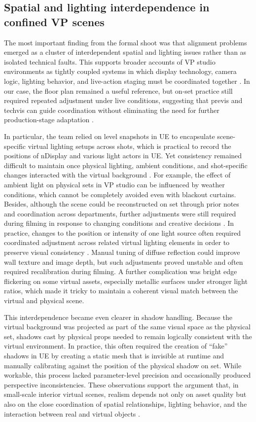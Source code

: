 \documentclass[conference]{IEEEtran}
\begin{document}
\subsection{Spatial and lighting interdependence in confined VP scenes}
The most important finding from the formal shoot was that alignment problems emerged as a cluster of interdependent spatial and lighting issues rather than as isolated technical faults. This supports broader accounts of VP studio environments as tightly coupled systems in which display technology, camera logic, lighting behavior, and live-action staging must be coordinated together \cite{Kavakli2022studio}. In our case, the floor plan remained a useful reference, but on-set practice still required repeated adjustment under live conditions, suggesting that previs and techvis can guide coordination without eliminating the need for further production-stage adaptation \cite{Kadner2019,Dean2026workflow}.

In particular, the team relied on level snapshots in UE to encapsulate scene-specific virtual lighting setups across shots, which is practical to record the positions of nDisplay and various light actors in UE. Yet consistency remained difficult to maintain once physical lighting, ambient conditions, and shot-specific changes interacted with the virtual background \cite{Kavakli2022studio}. For example, the effect of ambient light on physical sets in VP studio can be influenced by weather conditions, which cannot be completely avoided even with blackout curtains. Besides, although the scene could be reconstructed on set through prior notes and coordination across departments, further adjustments were still required during filming in response to changing conditions and creative decisions \cite{Dean2026workflow}. In practice, changes to the position or intensity of one light source often required coordinated adjustment across related virtual lighting elements in order to preserve visual consistency \cite{Kavakli2022studio,Kadner2019}. Manual tuning of diffuse reflection could improve wall texture and image depth, but such adjustments proved unstable and often required recalibration during filming. A further complication was bright edge flickering on some virtual assets, especially metallic surfaces under stronger light ratios, which made it tricky to maintain a coherent visual match between the virtual and physical scene.

This interdependence became even clearer in shadow handling. Because the virtual background was projected as part of the same visual space as the physical set, shadows cast by physical props needed to remain logically consistent with the virtual environment. In practice, this often required the creation of ``fake'' shadows in UE by creating a static mesh that is invisible at runtime and manually calibrating against the position of the physical shadow on set. While workable, this process lacked parameter-level precision and occasionally produced perspective inconsistencies. These observations support the argument that, in small-scale interior virtual scenes, realism depends not only on asset quality but also on the close coordination of spatial relationships, lighting behavior, and the interaction between real and virtual objects \cite{Lam2025,Dean2026workflow}.
\end{document}
